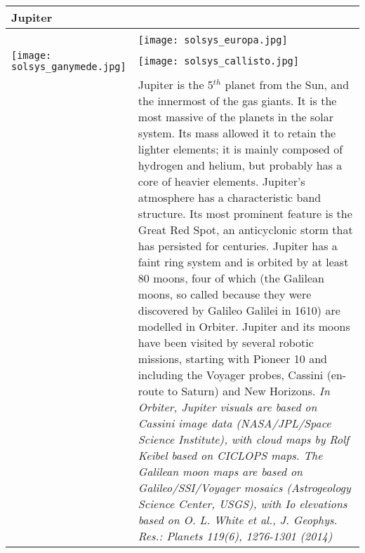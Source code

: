 \documentclass[Orbiter User Manual.tex]{subfiles}
\begin{document}
\begin{table}[H]
	\begin{tabularx}{\textwidth}{ |lX| }
	\hline\rule{0pt}{2ex}
	\textbf{Jupiter} &\\
	\hline\rule{0pt}{2ex}
	\adjustbox{valign=t}{
		\begin{tabular}{ c }
		\texttt{[image: solsys\_jupiter.jpg]}\\
			\adjustbox{valign=t}{
			\begin{tabular}{ ll }
			\texttt{[image: solsys\_io.jpg]} &
			\texttt{[image: solsys\_europa.jpg]}\\
			\texttt{[image: solsys\_ganymede.jpg]} &
			\texttt{[image: solsys\_callisto.jpg]}\\
			\end{tabular}
			}
		\end{tabular}
		}
	& \vfill
	Jupiter is the 5$^{th}$ planet from the Sun, and the innermost of the gas giants. It is the most massive of the planets in the solar system. Its mass allowed it to retain the lighter elements; it is mainly composed of hydrogen and helium, but probably has a core of heavier elements. Jupiter's atmosphere has a characteristic band structure. Its most prominent feature is the Great Red Spot, an anticyclonic storm that has persisted for centuries.\newline
	Jupiter has a faint ring system and is orbited by at least 80 moons, four of which (the Galilean moons, so called because they were discovered by Galileo Galilei in 1610) are modelled in Orbiter.\newline
	Jupiter and its moons have been visited by several robotic missions, starting with Pioneer 10 and including the Voyager probes, Cassini (en-route to Saturn) and New Horizons.\newline
	\newline
	\textit{In Orbiter, Jupiter visuals are based on Cassini image data (NASA/JPL/Space Science Institute), with cloud maps by Rolf Keibel based on CICLOPS maps.\newline
	The Galilean moon maps are based on Galileo/SSI/Voyager mosaics (Astrogeology Science Center, USGS), with Io elevations based on O. L. White et al., J. Geophys. Res.: Planets 119(6), 1276-1301 (2014)}\\
	\hline
	\end{tabularx}
\end{table}
\end{document}
